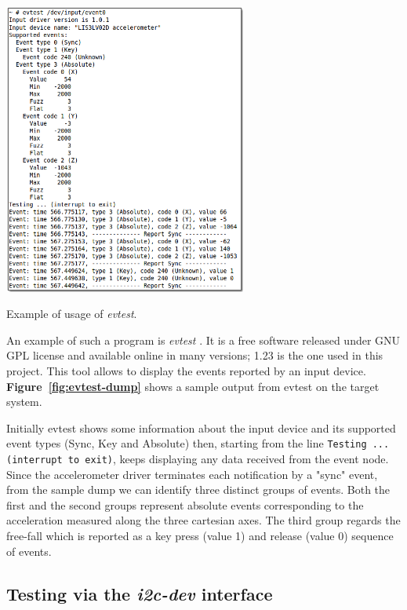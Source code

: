 \documentclass[a4paper,10pt]{article}
\makeatletter
\newenvironment{figurehere}{\def\@captype{figure}\vspace{2ex}}{\vspace{2ex}}
\newcommand{\keyword}[1]{\texttt{#1}}
\newcommand{\reff}[1]{\textbf{Figure~\ref{#1}}}
\makeatother
\begin{document}
\begin{multicols}{2}
\begin{figurehere}
 \centering
 \includegraphics[width=8cm]{./figures/dump-evtest.png}
 \caption{Example of usage of \emph{evtest}.}
 \label{fig:evtest-dump}
\end{figurehere}

An example of such a program is \emph{evtest} \cite{evtest}. It is a free
software released under GNU GPL license and available online in many versions;
1.23 is the one used in this project. This tool allows to display the events
reported by an input device. \reff{fig:evtest-dump} shows a sample output from
evtest on the target system.

Initially evtest shows some information about the input device and its supported
event types (Sync, Key and Absolute) then, starting from the line
\keyword{Testing ... (interrupt to exit)}, keeps displaying any data received
from the event node.
Since the accelerometer driver terminates each notification by a "sync" event, 
from the sample dump we can identify three distinct groups of events.
Both the first and the second groups represent absolute events corresponding to
the acceleration measured along the three cartesian axes.
The third group regards the free-fall which is reported as a key press
(value 1) and release (value 0) sequence of events.




\subsection{Testing via the \emph{i2c-dev} interface}
\label{sec:i2c-dev-testing}


\end{multicols}
\end{document}
